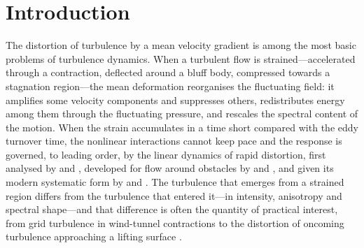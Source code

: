 \documentclass[lineno]{JFM-FLM_Au}
\begin{document}
\begin{abstract}
measured missing ingredient---scale-local relaxation---where it reaches
the scales of the imbalance, and decoupling the relaxation from the
eddy clock removes its deep-strain fade while a size cap preserves the
one-point physics: in a five-way comparison against the DNS and exact
linear theory on the benchmark observable, the mechanism moves the
model's spectral allocation of anisotropy towards the DNS at moderate
strain rapidity, with its rapid-strain saturation measured and stated.
The output is then carried to the motivating application: supplied to
Amiet's leading-edge-noise theory in place of the frozen von K\'arm\'an
inflow of standard practice, the computed distorted spectrum lowers the
predicted radiated level by $5$--$20$\,dB at the energy-containing
frequencies for total strains $0.5$--$2$, in a geometry-free kernel
ratio and in an assembled absolute prediction alike---the magnitude and
sign of the term that frozen-spectrum practice omits, opposite to the
surface-blocking correction with which it must be combined.
\end{abstract}

\begin{keywords}
\end{keywords}

\section{Introduction}\label{sec:intro}

The distortion of turbulence by a mean velocity gradient is among the
most basic problems of turbulence dynamics. When a turbulent flow is
strained---accelerated through a contraction, deflected around a bluff
body, compressed towards a stagnation region---the mean deformation
reorganises the fluctuating field: it amplifies some velocity components
and suppresses others, redistributes energy among them through the
fluctuating pressure, and rescales the spectral content of the motion.
When the strain accumulates in a time short compared with the eddy
turnover time, the nonlinear interactions cannot keep pace and the
response is governed, to leading order, by the linear dynamics of rapid
distortion, first analysed by \citet{BatchelorProudman1954} and
\citet{TownsendBook1976}, developed for flow around obstacles by
\citet{Hunt1973} and \citet{HuntGraham1978}, and given its modern
systematic form by \citet{HuntCarruthers1990} and
\citet{SagautCambon2018}. The turbulence that emerges from a strained
region differs from the turbulence that entered it---in intensity,
anisotropy and spectral shape---and that difference is often the
quantity of practical interest, from grid turbulence in wind-tunnel
contractions \citep{MillsCorrsin1959,TuckerReynolds1968,LeeReynolds1985}
to the distortion of oncoming turbulence approaching a lifting surface
\citep{HuntGraham1978,GoldsteinAtassi1976}.
\end{document}
